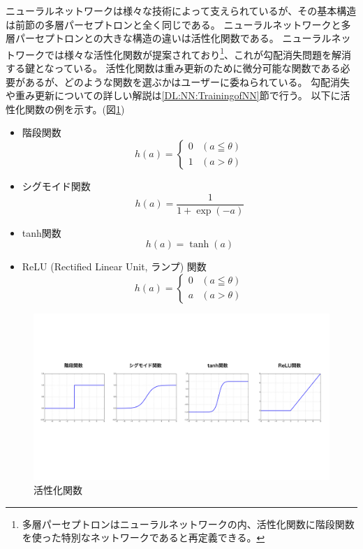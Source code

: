 ニューラルネットワークは様々な技術によって支えられているが、その基本構造は前節の多層パーセプトロンと全く同じである。
ニューラルネットワークと多層パーセプトロンとの大きな構造の違いは活性化関数である。
ニューラルネットワークでは様々な活性化関数が提案されており\footnote{多層パーセプトロンはニューラルネットワークの内、活性化関数に階段関数を使った特別なネットワークであると再定義できる。}、これが勾配消失問題を解消する鍵となっている。
活性化関数は重み更新のために微分可能な関数である必要があるが、どのような関数を選ぶかはユーザーに委ねられている。
勾配消失や重み更新についての詳しい解説は\ref{DL:NN:TrainingofNN}節で行う。
以下に活性化関数の例を示す。(図\ref{5ActivationFunction})
\begin{itemize}
  \item 階段関数
\begin{equation}
 h(a) = \left\{ \begin{array}{ll}
    0 & (a \leqq \theta) \\
    1 & (a > \theta)
 \end{array} \right.
\end{equation}
  \item シグモイド関数
\begin{equation}
 h(a) = \frac{1}{1+\exp{(-a)}}
\end{equation}
  \item tanh関数
\begin{equation}
 h(a) = \tanh{(a)}
\end{equation}
  \item ReLU (Rectified Linear Unit, ランプ) 関数\cite{ReLUpaper}
\begin{equation}
 h(a) = \left\{ \begin{array}{ll}
    0 & (a \leqq \theta) \\
    a & (a > \theta)
 \end{array} \right.
\end{equation}
\end{itemize}

\begin{figure}[h]
 \centering
 \includegraphics[trim = 0 200 0 200, width=1.0\textwidth, clip]{Figure/2DeepLearning/5ActivationFunction.png}
 \caption{活性化関数}
 \label{5ActivationFunction}
\end{figure}

